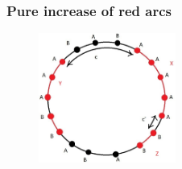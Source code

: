 \documentclass[]{book}
\theoremstyle{definition}
\begin{document}





\subsubsection{Pure increase of red arcs}
\begin{figure}[H]
    \centering
    \includegraphics[width=0.4\textwidth]{figures/sync_pure_increase_general.jpg}
    \caption{}
\end{figure}
\end{document}
